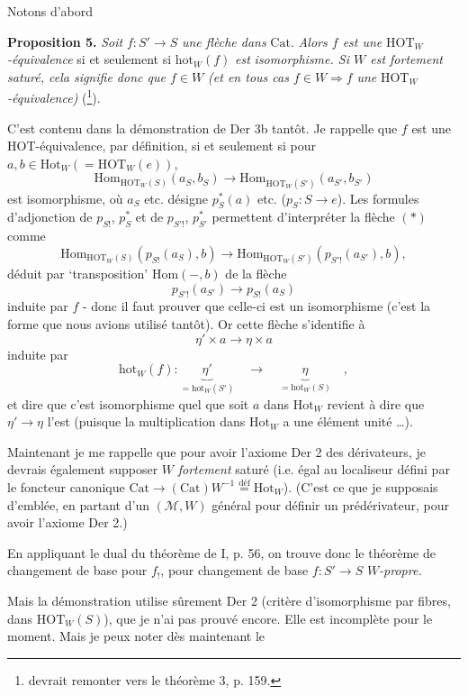 \documentclass[11pt]{article}
\newcommand{\printedpage}[1]{\marginpar{\footnotesize p.~#1}}
\newcommand{\msp}[1]{\marginpar{\footnotesize [#1]}}
\newcommand{\HOT}{\mathrm{HOT}}
\newcommand{\hot}{\mathrm{hot}}
\newcommand{\Cat}{\mathrm{Cat}}
\newcommand{\Hom}{\mathrm{Hom}}
\newcommand{\Hot}{\mathrm{Hot}}
\begin{document}
\noindent\printedpage{101}%
Notons d'abord

\noindent\textbf{Proposition 5.} \textit{Soit} $f : S' \longrightarrow S$ \textit{une flèche dans} $\Cat$. \textit{Alors $f$ est une} $\HOT_W$\textit{-équivalence} si et seulement si $\hot_W(f)$ \textit{est} \textit{isomorphisme. Si $W$ est fortement saturé, cela signifie donc que $f \in W$ (et en tous cas $f \in W \Longrightarrow f$} \textit{une} $\HOT_W$\textit{-équivalence)} (\footnote[81]{devrait remonter vers le théorème 3, p. 159.}).

C'est contenu dans la démonstration de Der 3b tantôt. Je rappelle que $f$ est une HOT-équivalence, par définition, si et seulement si pour $a, b \in \Hot_W (= \HOT_W(e))$,
\[
\Hom_{\HOT_W(S)}(a_S, b_S) \longrightarrow \Hom_{\HOT_W(S')}(a_{S'}, b_{S'}) \tag*{$(*)$}
\]
est isomorphisme, où $a_S$ etc. désigne $p_S^*(a)$ etc. ($p_S : S \longrightarrow e$). Les formules d'adjonction de $p_{S!}$, $p_S^*$ et de $p_{S'!}$, $p_{S'}^*$ permettent d'interpréter la flèche $(*)$ comme
\[
\Hom_{\HOT_W(S)}(p_{S!}(a_S), b) \longrightarrow \Hom_{\HOT_W(S')}(p_{S'!}(a_{S'}), b),
\]
\msp{page 165}déduit par ‘transposition’ $\Hom(-, b)$ de la flèche
\[
p_{S'!}(a_{S'}) \longrightarrow p_{S!}(a_S)
\]
induite par $f$ - donc il faut prouver que celle-ci est un isomorphisme (c'est la forme que nous avions utilisé tantôt). Or cette flèche s'identifie à
\[
\eta' \times a \longrightarrow \eta \times a
\]
induite par
\[
\hot_W(f) : \underbrace{\eta'}_{= \hot_W(S')} \quad \longrightarrow \quad \underbrace{\eta}_{= \hot_W(S)} \quad ,
\]
et dire que c'est isomorphisme quel que soit $a$ dans $\Hot_W$ revient à dire que $\eta' \longrightarrow \eta$ l'est (puisque la multiplication dans $\Hot_W$ a une élément unité \dots). %

Maintenant je me rappelle que pour avoir l'axiome Der 2 des dérivateurs, je devrais également supposer $W$ \textit{fortement} saturé (i.e. égal au localiseur défini par le foncteur canonique $\Cat \longrightarrow (\Cat)W^{-1} \overset{\text{déf}}{=} \Hot_W$). (C'est ce que je supposais d'emblée, en partant d'un $(\mathcal{M}, W)$ général pour définir un prédérivateur, pour avoir l'axiome Der 2.)

En appliquant le dual du théorème de I, p. 56, on trouve donc le théorème de changement de base pour $f_!$, pour changement de base $f : S' \longrightarrow S$ \textit{$W$-propre.}

\msp{page 166}\marginpar{$\Vert$}Mais la démonstration utilise sûrement Der 2 (critère d'isomorphisme par fibres, dans $\HOT_W(S)$), que je n'ai pas prouvé encore. Elle est incomplète pour le moment. Mais je peux noter dès maintenant le
\end{document}

